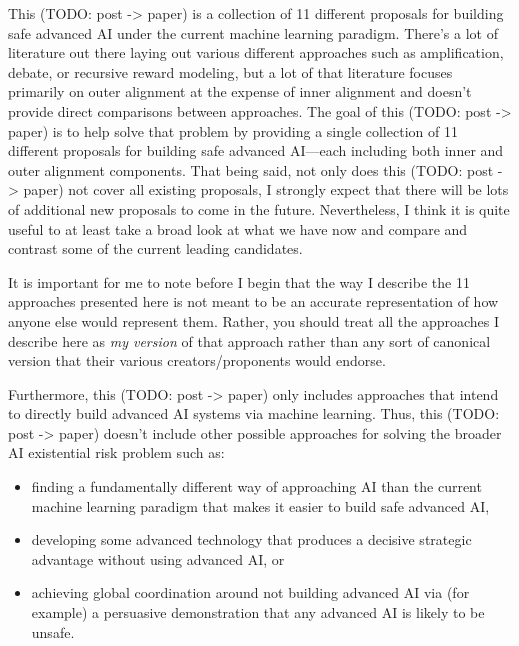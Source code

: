 This (TODO: post -> paper) is a collection of 11 different proposals for building safe advanced AI under the current machine learning paradigm. There's a lot of literature out there laying out various different approaches such as amplification\cite{TODO: cite https://www.alignmentforum.org/s/EmDuGeRw749sD3GKd}, debate\cite{TODO: cite https://openai.com/blog/debate}, or recursive reward modeling\cite{TODO: cite https://medium.com/@deepmindsafetyresearch/scalable-agent-alignment-via-reward-modeling-bf4ab06dfd84}, but a lot of that literature focuses primarily on outer alignment at the expense of inner alignment\cite{TODO: cite https://arxiv.org/abs/1906.01820} and doesn't provide direct comparisons between approaches. The goal of this (TODO: post -> paper) is to help solve that problem by providing a single collection of 11 different proposals for building safe advanced AI---each including both inner and outer alignment components. That being said, not only does this (TODO: post -> paper) not cover all existing proposals, I strongly expect that there will be lots of additional new proposals to come in the future. Nevertheless, I think it is quite useful to at least take a broad look at what we have now and compare and contrast some of the current leading candidates.

It is important for me to note before I begin that the way I describe the 11 approaches presented here is not meant to be an accurate representation of how anyone else would represent them. Rather, you should treat all the approaches I describe here as \textit{my version} of that approach rather than any sort of canonical version that their various creators/proponents would endorse.

Furthermore, this (TODO: post -> paper) only includes approaches that intend to directly build advanced AI systems via machine learning. Thus, this (TODO: post -> paper) doesn't include other possible approaches for solving the broader AI existential risk problem such as:

\begin{itemize}
\item finding a fundamentally different way of approaching AI than the current machine learning paradigm that makes it easier to build safe advanced AI,
\item developing some advanced technology that produces a decisive strategic advantage\cite{TODO: cite https://www.lesswrong.com/posts/vkjWGJrFWBnzHtxrw/superintelligence-7-decisive-strategic-advantage} without using advanced AI, or
\item achieving global coordination around not building advanced AI via (for example) a persuasive demonstration that any advanced AI is likely to be unsafe.
\end{itemize}


